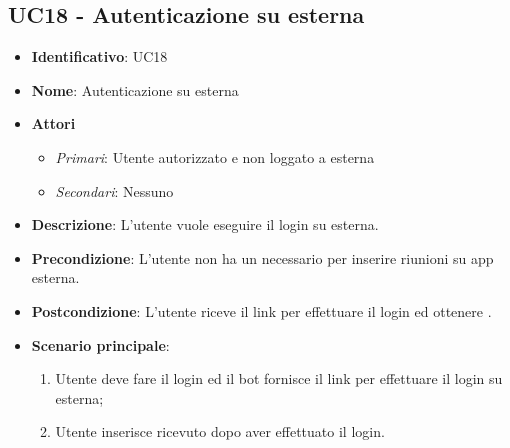 \subsection{UC18 - Autenticazione su  esterna}
\begin{itemize}
	\item \textbf{Identificativo}: UC18
	\item \textbf{Nome}: Autenticazione su  esterna
	\item \textbf{Attori}
	\begin{itemize} 
		\item \textit{Primari}: Utente autorizzato e non loggato a  esterna
		\item \textit{Secondari}: Nessuno
	\end{itemize}
	\item \textbf{Descrizione}: L'utente vuole eseguire il login su  esterna.
	\item \textbf{Precondizione}: L'utente non ha un  necessario per inserire riunioni su app esterna.
	\item \textbf{Postcondizione}: L'utente riceve il link per effettuare il login ed ottenere .
	\item \textbf{Scenario principale}: \begin{enumerate}
		\item Utente deve fare il login ed il bot fornisce il link per effettuare il login su  esterna; 
		\item Utente inserisce  ricevuto dopo aver effettuato il login.
	\end{enumerate}
\end{itemize}
